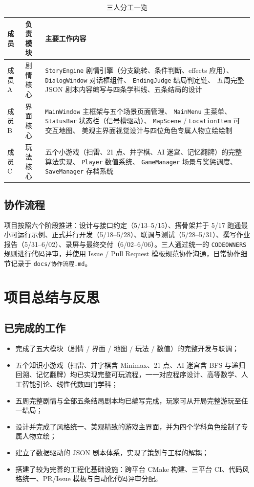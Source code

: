 \documentclass[12pt]{article}
\newcommand{\module}[1]{\texttt{#1}}
\begin{document}
\begin{table}[h]
\centering
\small
\begin{tabular}{@{}p{2cm}p{2.6cm}p{9.5cm}@{}}
\toprule
\textbf{成员} & \textbf{负责模块} & \textbf{主要工作内容} \\
\midrule
成员 A & 剧情核心 &
\module{StoryEngine} 剧情引擎（分支跳转、条件判断、effects 应用）、
\module{DialogWindow} 对话框组件、
\module{EndingJudge} 结局判定链、
五周完整 JSON 剧本内容编写与四条学科线、五条结局的设计 \\
\addlinespace
成员 B & 界面核心 &
\module{MainWindow} 主框架与五个场景页面管理、
\module{MainMenu} 主菜单、
\module{StatusBar} 状态栏（信号槽驱动）、
\module{MapScene} / \module{LocationItem} 可交互地图、
美观主界面视觉设计与四位角色专属人物立绘绘制 \\
\addlinespace
成员 C & 玩法核心 &
五个小游戏（扫雷、21 点、井字棋、AI 迷宫、记忆翻牌）的完整算法实现、
\module{Player} 数值系统、
\module{GameManager} 场景与奖惩调度、
\module{SaveManager} 存档系统 \\
\bottomrule
\end{tabular}
\caption{三人分工一览}
\end{table}

\subsection{协作流程}
项目按照六个阶段推进：设计与接口约定（5/13–5/15）、搭骨架并于 5/17 跑通最小可运行示例、正式并行开发（5/18–5/28）、联调与测试（5/28–5/31）、撰写作业报告（5/31–6/02）、录屏与最终交付（6/02–6/06）。三人通过统一的 \texttt{CODEOWNERS} 规则进行代码评审，并使用 Issue / Pull Request 模板规范协作沟通，日常协作细节记录于 \texttt{docs/协作流程.md}。

\section{项目总结与反思}

\subsection{已完成的工作}
\begin{itemize}[itemsep=2pt]
  \item 完成了五大模块（剧情 / 界面 / 地图 / 玩法 / 数值）的完整开发与联调；
  \item 五个知识小游戏（扫雷、井字棋含 Minimax、21 点、AI 迷宫含 BFS 与递归回溯、记忆翻牌）均已实现完整可玩流程，一一对应程序设计、高等数学、人工智能引论、线性代数四门学科；
  \item 五周完整剧情与全部五条结局剧本均已编写完成，玩家可从开局完整游玩至任一结局；
  \item 设计并完成了风格统一、美观精致的游戏主界面，并为四个学科角色绘制了专属人物立绘；
  \item 建立了数据驱动的 JSON 剧本体系，实现了策划与工程的解耦；
  \item 搭建了较为完善的工程化基础设施：跨平台 CMake 构建、三平台 CI、代码风格统一、PR/Issue 模板与自动化代码评审分配。
\end{itemize}
\end{document}
